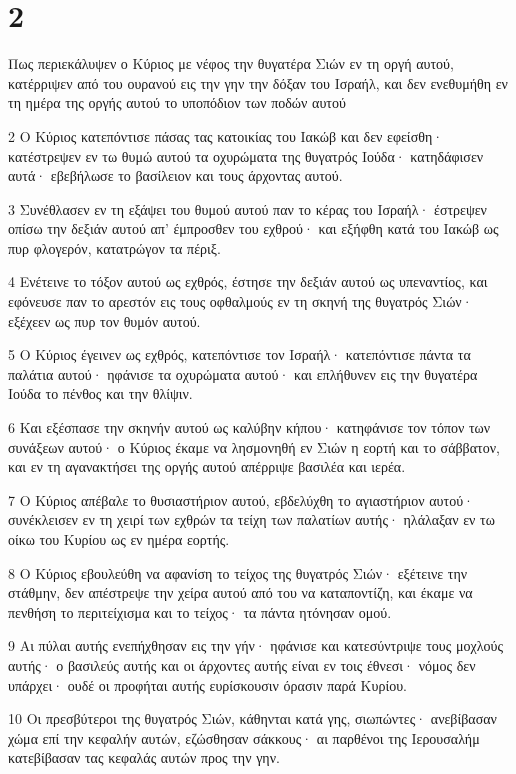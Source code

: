 \chapter{2}

\par Πως περιεκάλυψεν ο Κύριος με νέφος την θυγατέρα Σιών εν τη οργή αυτού, κατέρριψεν από του ουρανού εις την γην την δόξαν του Ισραήλ, και δεν ενεθυμήθη εν τη ημέρα της οργής αυτού το υποπόδιον των ποδών αυτού
\par 2 Ο Κύριος κατεπόντισε πάσας τας κατοικίας του Ιακώβ και δεν εφείσθη· κατέστρεψεν εν τω θυμώ αυτού τα οχυρώματα της θυγατρός Ιούδα· κατηδάφισεν αυτά· εβεβήλωσε το βασίλειον και τους άρχοντας αυτού.
\par 3 Συνέθλασεν εν τη εξάψει του θυμού αυτού παν το κέρας του Ισραήλ· έστρεψεν οπίσω την δεξιάν αυτού απ' έμπροσθεν του εχθρού· και εξήφθη κατά του Ιακώβ ως πυρ φλογερόν, κατατρώγον τα πέριξ.
\par 4 Ενέτεινε το τόξον αυτού ως εχθρός, έστησε την δεξιάν αυτού ως υπεναντίος, και εφόνευσε παν το αρεστόν εις τους οφθαλμούς εν τη σκηνή της θυγατρός Σιών· εξέχεεν ως πυρ τον θυμόν αυτού.
\par 5 Ο Κύριος έγεινεν ως εχθρός, κατεπόντισε τον Ισραήλ· κατεπόντισε πάντα τα παλάτια αυτού· ηφάνισε τα οχυρώματα αυτού· και επλήθυνεν εις την θυγατέρα Ιούδα το πένθος και την θλίψιν.
\par 6 Και εξέσπασε την σκηνήν αυτού ως καλύβην κήπου· κατηφάνισε τον τόπον των συνάξεων αυτού· ο Κύριος έκαμε να λησμονηθή εν Σιών η εορτή και το σάββατον, και εν τη αγανακτήσει της οργής αυτού απέρριψε βασιλέα και ιερέα.
\par 7 Ο Κύριος απέβαλε το θυσιαστήριον αυτού, εβδελύχθη το αγιαστήριον αυτού· συνέκλεισεν εν τη χειρί των εχθρών τα τείχη των παλατίων αυτής· ηλάλαξαν εν τω οίκω του Κυρίου ως εν ημέρα εορτής.
\par 8 Ο Κύριος εβουλεύθη να αφανίση το τείχος της θυγατρός Σιών· εξέτεινε την στάθμην, δεν απέστρεψε την χείρα αυτού από του να καταποντίζη, και έκαμε να πενθήση το περιτείχισμα και το τείχος· τα πάντα ητόνησαν ομού.
\par 9 Αι πύλαι αυτής ενεπήχθησαν εις την γήν· ηφάνισε και κατεσύντριψε τους μοχλούς αυτής· ο βασιλεύς αυτής και οι άρχοντες αυτής είναι εν τοις έθνεσι· νόμος δεν υπάρχει· ουδέ οι προφήται αυτής ευρίσκουσιν όρασιν παρά Κυρίου.
\par 10 Οι πρεσβύτεροι της θυγατρός Σιών, κάθηνται κατά γης, σιωπώντες· ανεβίβασαν χώμα επί την κεφαλήν αυτών, εζώσθησαν σάκκους· αι παρθένοι της Ιερουσαλήμ κατεβίβασαν τας κεφαλάς αυτών προς την γην.
